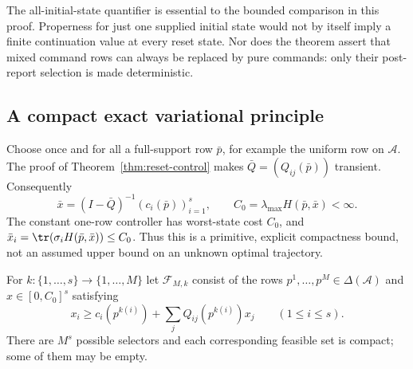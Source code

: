 The all-initial-state quantifier is essential to the bounded comparison
in this proof.  Properness for just one supplied initial state would
not by itself imply a finite continuation value at every reset state.
Nor does the theorem assert that mixed command rows can always be
replaced by pure commands: only their post-report selection is made
deterministic.

\subsection{A compact exact variational principle}

Choose once and for all a full-support row $\bar p$, for example the
uniform row on $\mathcal A$.  The proof of
Theorem~\ref{thm:reset-control} makes $\bar Q=(Q_{ij}(\bar p))$
transient.  Consequently
\begin{equation}\label{eq:r78-explicit-cap}
 \bar x=(I-\bar Q)^{-1}(c_i(\bar p))_{i=1}^s,
 \qquad C_0=\lambda_{\max}H(\bar p,\bar x)<\infty.
\end{equation}
The constant one-row controller has worst-state cost $C_0$, and
$\bar x_i=\tr(\sigma_iH(\bar p,\bar x))\le C_0$.
Thus this is a primitive, explicit compactness bound, not an assumed
upper bound on an unknown optimal trajectory.

For $k:\{1,\ldots,s\}\to\{1,\ldots,M\}$ let $\mathcal F_{M,k}$
consist of the rows $p^1,\ldots,p^M\in\Delta(\mathcal A)$ and
$x\in[0,C_0]^s$ satisfying
\begin{equation}\label{eq:r78-supersolution}
 x_i\ge c_i(p^{k(i)})+\sum_jQ_{ij}(p^{k(i)})x_j
 \qquad(1\le i\le s).
\end{equation}
There are $M^s$ possible selectors and each corresponding feasible
set is compact; some of them may be empty.


